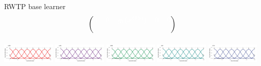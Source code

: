\documentclass[t,10pt]{beamer}
\begin{document}
\begin{frame}{RWTP base learner}
$$\begin{blockarray}{ccccc}
\begin{block}{(ccccc)}
      \color{white}0 & \color{white}0 & \color{white}\bm{g_l(x^{(75)})} & \color{white}0 & \color{white}0 \\
      \phantom{x}\\
    \end{block}
  \end{blockarray}
  $$
  \normalsize
  {\includegraphics[width=0.19\textwidth]{figures/fig-bs0-GER.png}}
  {\includegraphics[width=0.19\textwidth]{figures/fig-bs0-USA.png}}
  {\includegraphics[width=0.19\textwidth]{figures/fig-bs0-SWE.png}}
  {\includegraphics[width=0.19\textwidth]{figures/fig-bs0-ZAF.png}}
  {\includegraphics[width=0.19\textwidth]{figures/fig-bs0-ETH.png}}
  \addtocounter{framenumber}{-1}
\end{frame}
\end{document}
